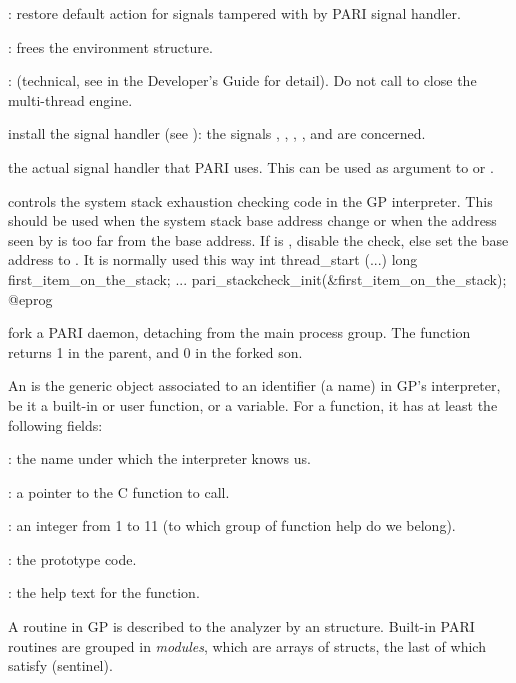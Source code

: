   : restore  default action for signals
tampered with by PARI signal handler.

  : frees the  environment structure.

  : (technical, see  in the Developer's
Guide for detail). Do not call  to close the multi-thread
engine.

 install the signal handler 
(see ): the signals , , ,
,  and  are concerned.

 the actual signal handler that
PARI uses. This can be used as argument to  or
.

 controls the system stack
exhaustion checking code in the GP interpreter. This should be used when the
system stack base address change or when the address seen by 
is too far from the base address. If  is , disable the
check, else set the base address to . It is normally used this
way
\bprog
int thread_start (...)
{
  long first_item_on_the_stack;
  ...
  pari_stackcheck_init(&first_item_on_the_stack);
}
@eprog

 fork a PARI daemon, detaching from the main
process group. The function returns 1 in the parent, and 0 in the
forked son.


An  is the generic object associated to an identifier (a name)
in GP's interpreter, be it a built-in or user function, or a variable. For
a function, it has at least the following fields:

  : the name under which the interpreter knows us.

  :  a pointer to the C function to call.

  : an integer from 1 to 11 (to which group of function
                    help do we belong).

  : the prototype code.

  : the help text for the function.

A routine in GP is described to the analyzer by an 
structure. Built-in PARI routines are grouped in \emph{modules}, which
are arrays of  structs, the last of which satisfy
 (sentinel).

